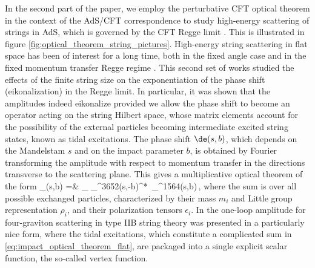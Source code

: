 In the second part of the paper, we employ the perturbative CFT optical theorem in the context of the AdS/CFT correspondence \cite{Maldacena:1997re,Witten:1998qj,Gubser:1998bc}
to study high-energy scattering of strings in AdS, which is governed by the CFT Regge limit \cite{Cornalba:2006xk,Cornalba:2006xm}. This is illustrated in figure \ref{fig:optical_theorem_string_pictures}.
High-energy string scattering in flat space has been of interest for a long time, both in the fixed angle case \cite{Gross:1987kza,Gross:1987ar} and in the fixed momentum transfer Regge regime \cite{Amati:1987wq,Amati:1987uf,Amati:1988tn}. This second set of works studied the effects of the finite string size on the exponentiation of the phase shift (eikonalization) in the Regge limit. In particular, 
it was shown that the amplitudes indeed eikonalize provided we allow the phase shift to become an operator acting on the string Hilbert space, whose matrix elements account for the possibility of the external particles becoming intermediate excited string states, known as tidal excitations.
The phase shift $\de(s,b)$, which depends on the Mandelstam $s$ and on the impact parameter $b$, is 
obtained by Fourier transforming the amplitude with respect to momentum transfer 
in the directions transverse to the scattering plane. This gives a multiplicative optical theorem of the form
	\bea
		\Im \de_{}(s,b) 
		={}&  \sum\limits_{}
		\de_^{3652}(s,-b)^* \,\de_^{1564}(s,b)\,,
where the sum is over all possible exchanged particles, characterized by their mass $m_i$ and Little group representation $\rho_i$,
and their polarization tensors $\epsilon_i$.
In \cite{Amati:1987uf} the one-loop amplitude for four-graviton scattering in type IIB string theory was presented in a particularly nice form, where the tidal excitations, which constitute a complicated sum in \eqref{eq:impact_optical_theorem_flat}, are packaged into a single explicit scalar function, the so-called vertex function.
 
